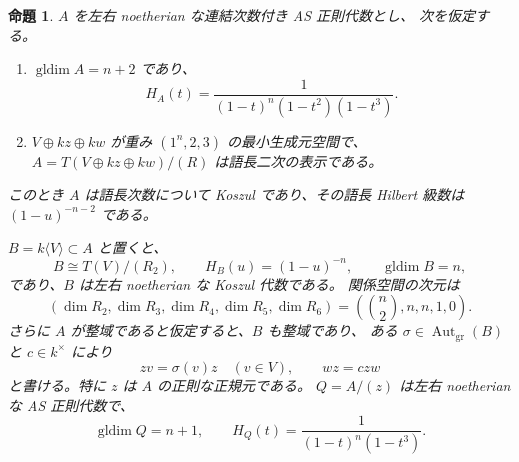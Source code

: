 \documentclass[11pt,a4paper]{ltjsarticle}
\newtheorem{proposition}[theorem]{命題}
\theoremstyle{definition}
\begin{document}
\begin{proposition}\label{prop:quadratic-general-structure}
$A$ を左右 noetherian な連結次数付き AS 正則代数とし、
次を仮定する。
\begin{enumerate}
 \item $\operatorname{gldim}A=n+2$ であり、
 \[
 H_A(t)=\frac{1}{(1-t)^n(1-t^2)(1-t^3)}.
 \]
 \item $V\oplus kz\oplus kw$ が重み $(1^n,2,3)$ の最小生成元空間で、
 $A=T(V\oplus kz\oplus kw)/(R)$ は語長二次の表示である。
\end{enumerate}
このとき $A$ は語長次数について Koszul であり、その語長 Hilbert 級数は
$(1-u)^{-n-2}$ である。

$B=k\langle V\rangle\subset A$ と置くと、
\[
 B\cong T(V)/(R_2),\qquad
 H_B(u)=(1-u)^{-n},\qquad
 \operatorname{gldim}B=n,
\]
であり、$B$ は左右 noetherian な Koszul 代数である。
関係空間の次元は
\begin{equation}\label{eq:general-quadratic-relation-numbers}
 (\dim R_2,\dim R_3,\dim R_4,\dim R_5,\dim R_6)
 =\left(\binom n2,n,n,1,0\right).
\end{equation}
さらに $A$ が整域であると仮定すると、$B$ も整域であり、
ある $\sigma\in\operatorname{Aut}_{\mathrm{gr}}(B)$ と $c\in k^\times$ により
\begin{equation}\label{eq:general-z-normal}
 zv=\sigma(v)z\quad(v\in V),\qquad wz=c zw
\end{equation}
と書ける。特に $z$ は $A$ の正則な正規元である。
$Q=A/(z)$ は左右 noetherian な AS 正則代数で、
\begin{equation}\label{eq:general-normal-quotient}
 \operatorname{gldim}Q=n+1,\qquad
 H_Q(t)=\frac{1}{(1-t)^n(1-t^3)}.
\end{equation}
\end{proposition}
\end{document}
